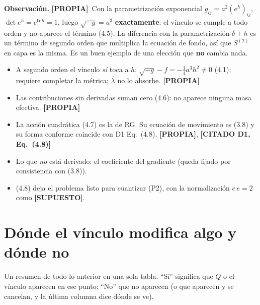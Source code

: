 \documentclass[11pt,a4paper]{article}
\newcommand{\propia}{{\bfseries\color{TealBlue}[PROPIA]}}
\newcommand{\supuesto}{{\bfseries\color{Plum}[SUPUESTO]}}
\newcommand{\citado}[1]{{\bfseries\color{RoyalBlue}[CITADO #1]}}
\newcommand{\sub}[2]{\par\medskip\noindent{\bfseries\color{NavyBlue}#1}\quad\textbf{#2}}
\begin{document}
\sub{4.7}{Observación.} \propia\ Con la parametrización exponencial $g_{ij}=a^2(e^h)_{ij}$, $\det e^h=e^{\mathrm{tr}\,h}=1$, luego $\sqrt{-g}=a^3$ \textbf{exactamente}: el vínculo se cumple a todo orden y no aparece el término (4.5). La diferencia con la parametrización $\delta+h$ es un término de segundo orden que multiplica la ecuación de fondo, así que $S^{(2)}$ en capa es la misma. Es un buen ejemplo de una elección que \textbf{no} cambia nada.

\begin{llevarse}
\begin{itemize}[nosep]
\item A segundo orden el vínculo \emph{sí} toca a $h$: $\sqrt{-g}-f=-\tfrac14a^3h^2\neq0$ (4.1); requiere completar la métrica; $\bar\lambda$ no lo absorbe. \propia
\item Las contribuciones sin derivadas suman cero (4.6): no aparece ninguna masa efectiva. \propia
\item La acción cuadrática (4.7) es la de RG. Su ecuación de movimiento es (3.8) y su forma conforme coincide con D1 Eq.~(4.8). \propia, \citado{D1, Eq.~(4.8)}
\item Lo que \emph{no} está derivado: el coeficiente del gradiente (queda fijado por consistencia con (3.8)).
\item (4.8) deja el problema listo para cuantizar (P2), con la normalización $e\,e=2$ como \supuesto.
\end{itemize}
\end{llevarse}

\section{Dónde el vínculo modifica algo y dónde no}

\begin{enpalabras}
Un resumen de todo lo anterior en una sola tabla. ``Sí'' significa que $Q$ o el vínculo aparecen en ese punto; ``No'' que no aparecen (o que aparecen y se cancelan, y la última columna dice dónde se ve).
\end{enpalabras}
\end{document}
